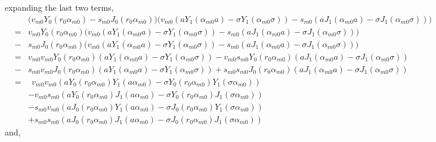 \documentclass{article}
\begin{document}
%
expanding the last two terms,
%
\begin{eqnarray}
    & & \Big(v_{m0}Y_0(r_0\alpha_{m0}) - s_{m0}J_0(r_0\alpha_{m0})\Big)
        \Big(
        v_{m0} \left(aY_1(\alpha_{m0}a) - \sigma Y_1(\alpha_{m0}\sigma)\right) -
        s_{m0} \left(aJ_1(\alpha_{m0}a) - \sigma J_1(\alpha_{m0}\sigma)\right)
        \Big)
\nonumber\\
    &=& v_{m0}Y_0(r_0\alpha_{m0}) \Big(
        v_{m0} \left(aY_1(\alpha_{m0}a) - \sigma Y_1(\alpha_{m0}\sigma)\right) -
        s_{m0} \left(aJ_1(\alpha_{m0}a) - \sigma J_1(\alpha_{m0}\sigma)\right)
        \Big)
\nonumber\\
    &-& s_{m0}J_0(r_0\alpha_{m0}) \Big(
        v_{m0} \left(aY_1(\alpha_{m0}a) - \sigma Y_1(\alpha_{m0}\sigma)\right) -
        s_{m0} \left(aJ_1(\alpha_{m0}a) - \sigma J_1(\alpha_{m0}\sigma)\right)
        \Big)
%
\nonumber\\
    &=& v_{m0}v_{m0} Y_0(r_0\alpha_{m0})\left(aY_1(\alpha_{m0}a) - \sigma Y_1(\alpha_{m0}\sigma)\right)
     -  v_{m0}s_{m0} Y_0(r_0\alpha_{m0})\left(aJ_1(\alpha_{m0}a) - \sigma J_1(\alpha_{m0}\sigma)\right)
\nonumber\\
    &-& s_{m0}v_{m0} J_0(r_0\alpha_{m0})\left(aY_1(\alpha_{m0}a) - \sigma Y_1(\alpha_{m0}\sigma)\right)
     +  s_{m0}s_{m0} J_0(r_0\alpha_{m0})\left(aJ_1(\alpha_{m0}a) - \sigma J_1(\alpha_{m0}\sigma)\right)
%
\nonumber\\
    &=& \ \  v_{m0}v_{m0} (aY_0(r_0\alpha_{m0})Y_1(a\alpha_{m0}) - \sigma Y_0(r_0\alpha_{m0})Y_1(\sigma\alpha_{m0}))
\nonumber\\
    & & - v_{m0}s_{m0} (aY_0(r_0\alpha_{m0})J_1(a\alpha_{m0}) - \sigma Y_0(r_0\alpha_{m0})J_1(\sigma\alpha_{m0}))
\nonumber\\
    & & - s_{m0}v_{m0} (aJ_0(r_0\alpha_{m0})Y_1(a\alpha_{m0}) - \sigma J_0(r_0\alpha_{m0})Y_1(\sigma\alpha_{m0}))
\nonumber\\
    & & + s_{m0}s_{m0} (aJ_0(r_0\alpha_{m0})J_1(a\alpha_{m0}) - \sigma J_0(r_0\alpha_{m0})J_1(\sigma\alpha_{m0}))
\end{eqnarray}
%
and,
%
\end{document}
